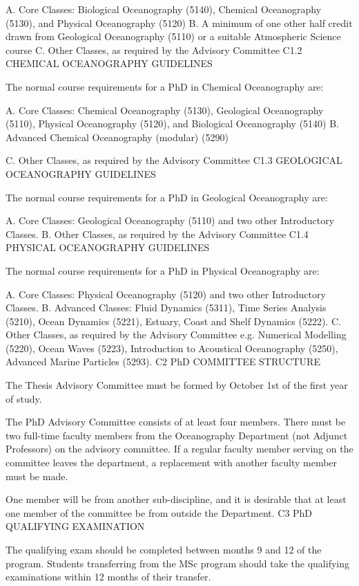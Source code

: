 \documentclass{article}
\begin{document}
A.	Core Classes: Biological Oceanography (5140), Chemical Oceanography (5130), and Physical Oceanography (5120)
B.	A minimum of one other half credit drawn from Geological Oceanography (5110) or a suitable Atmospheric Science course
C.	Other Classes, as required by the Advisory Committee
C1.2	CHEMICAL OCEANOGRAPHY GUIDELINES

The normal course requirements for a PhD in Chemical Oceanography are:

A.	Core Classes: Chemical Oceanography (5130), Geological Oceanography (5110), Physical Oceanography (5120), and Biological Oceanography (5140)
B.	Advanced Chemical Oceanography (modular) (5290)
 

C.	Other Classes, as required by the Advisory Committee
C1.3	GEOLOGICAL OCEANOGRAPHY GUIDELINES

The normal course requirements for a PhD in Geological Oceanography are:

A.	Core Classes: Geological Oceanography (5110) and two other Introductory Classes.
B.	Other Classes, as required by the Advisory Committee
C1.4	PHYSICAL OCEANOGRAPHY GUIDELINES

The normal course requirements for a PhD in Physical Oceanography are:

A.	Core Classes: Physical Oceanography (5120) and two other Introductory Classes.
B.	Advanced Classes: Fluid Dynamics (5311), Time Series Analysis (5210), Ocean Dynamics (5221), Estuary, Coast and Shelf Dynamics (5222).
C.	Other Classes, as required by the Advisory Committee e.g. Numerical Modelling (5220), Ocean Waves (5223), Introduction to Acoustical Oceanography (5250), Advanced Marine Particles (5293).
C2	PhD COMMITTEE STRUCTURE

The Thesis Advisory Committee must be formed by October 1st of the first year of study.

The PhD Advisory Committee consists of at least four members. There must be two full-time faculty members from the Oceanography Department (not Adjunct Professors) on the advisory committee. If a regular faculty member serving on the committee leaves the department, a replacement with another faculty member must be made.

One member will be from another sub-discipline, and it is desirable that at least one member of the committee be from outside the Department.
C3	PhD QUALIFYING EXAMINATION

The qualifying exam should be completed between months 9 and 12 of the program.
Students transferring from the MSc program should take the qualifying examinations within 12 months of their transfer.
\end{document}
